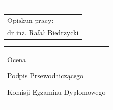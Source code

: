 \begin{titlepage}
{\begin{center}
	\vspace*{7\baselineskip}
	\hfill\mbox{}\par\vspace*{\baselineskip}\noindent
	\begin{tabular}[b]{@{}p{3cm}@{\ }l@{}}
	    {\large\hfill } & {\large }
	\end{tabular}
	\hfill
	\begin{tabular}[b]{@{}l@{}}
	Opiekun pracy: \\[\smallskipamount]
	{\large dr inż. Rafał Biedrzycki}
	\end{tabular}\par
	\vspace*{4\baselineskip}
    \begin{tabular}{p{\textwidth}}
    \begin{flushleft}
	\begin{minipage}{7cm}
	Ocena \dotfill
	\par\vspace{1.6\baselineskip}
	\dotfill
	\par\noindent
	\centerline{\footnotesize Podpis Przewodniczącego} \par
	\centerline{\footnotesize Komisji Egzaminu Dyplomowego}\par
	\end{minipage}
    \end{flushleft}
    \end{tabular}
    \end{center}}


\end{titlepage}
